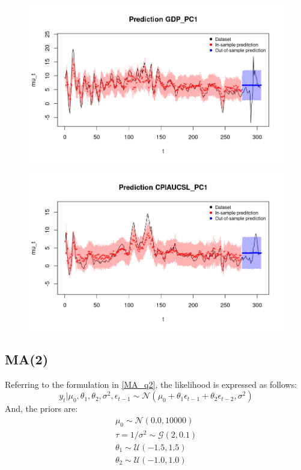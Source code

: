 \begin{figure}[h]
    \centering
    \includegraphics[width=\textwidth]{images/3-MA/gdp_prediction.png}
    \label{fig:MA_first}
\end{figure}
\begin{figure}[h]
    \centering
    \includegraphics[width=\textwidth]{images/3-MA/infl_prediction.png}
    \label{fig:MA_second}
\end{figure}

\subsection*{MA(2)}
\label{MA(2)}
Referring to the formulation in \ref{MA_q2}, the likelihood is expressed as follows:
$$
y_t | \mu_0, \theta_1, \theta_2, \sigma^2, \epsilon_{t-1} \sim \mathcal{N}(\mu_0 + \theta_1 \epsilon_{t-1} + \theta_2 \epsilon_{t-2},\sigma^2)
$$
And, the priors are:
\begin{equation}
    \begin{split}
        \mu_0 \sim \mathcal{N}(0.0, 10000) \\
        \tau = 1 / \sigma^2 \sim \mathcal{G}(2, 0.1) \\
        \theta_1 \sim \mathcal{U}(-1.5, 1.5) \\
        \theta_2 \sim \mathcal{U}(-1.0, 1.0)
    \end{split}
\end{equation}

